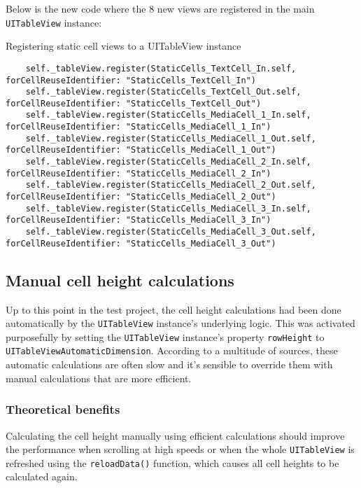 \documentclass[a4paper,12pt]{article}
\begin{document}
Below is the new code where the 8 new views are registered in the main \texttt{UITableView} instance:
\begin{listing}[H]
  \caption{Registering static cell views to a UITableView instance}
  \begin{verbatim}
    self._tableView.register(StaticCells_TextCell_In.self, forCellReuseIdentifier: "StaticCells_TextCell_In")
    self._tableView.register(StaticCells_TextCell_Out.self, forCellReuseIdentifier: "StaticCells_TextCell_Out")
    self._tableView.register(StaticCells_MediaCell_1_In.self, forCellReuseIdentifier: "StaticCells_MediaCell_1_In")
    self._tableView.register(StaticCells_MediaCell_1_Out.self, forCellReuseIdentifier: "StaticCells_MediaCell_1_Out")
    self._tableView.register(StaticCells_MediaCell_2_In.self, forCellReuseIdentifier: "StaticCells_MediaCell_2_In")
    self._tableView.register(StaticCells_MediaCell_2_Out.self, forCellReuseIdentifier: "StaticCells_MediaCell_2_Out")
    self._tableView.register(StaticCells_MediaCell_3_In.self, forCellReuseIdentifier: "StaticCells_MediaCell_3_In")
    self._tableView.register(StaticCells_MediaCell_3_Out.self, forCellReuseIdentifier: "StaticCells_MediaCell_3_Out")
  \end{verbatim}
\end{listing}

\subsection{Manual cell height calculations}\label{subsection:ManualCellHeightCalculations}
Up to this point in the test project, the cell height calculations had been done automatically by the \texttt{UITableView} instance's underlying logic. This was activated purposefully by setting the \texttt{UITableView} instance's property \texttt{rowHeight} to \texttt{UITableViewAutomaticDimension}. According to a multitude of sources, these automatic calculations are often slow and it's sensible to override them with manual calculations that are more efficient.\cite{PerfectSmoothScrollingInUITableViews}\cite{HowToMakeDynamicTableViewCellHeight}\cite{MediumSmoothScrollPrearo}

\subsubsection*{Theoretical benefits}
Calculating the cell height manually using efficient calculations should improve the performance when scrolling at high speeds or when the whole \texttt{UITableView} is refreshed using the \texttt{reloadData()} function, which causes all cell heights to be calculated again.
\end{document}
